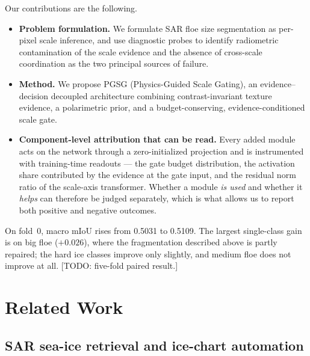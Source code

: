 \documentclass[preprint,12pt,authoryear]{elsarticle}
\begin{document}
Our contributions are the following.
\begin{itemize}
\item \textbf{Problem formulation.} We formulate SAR floe size segmentation as
      per-pixel scale inference, and use diagnostic probes to identify
      radiometric contamination of the scale evidence and the absence of
      cross-scale coordination as the two principal sources of failure.
\item \textbf{Method.} We propose PGSG (Physics-Guided Scale Gating), an
      evidence--decision decoupled architecture combining contrast-invariant
      texture evidence, a polarimetric prior, and a budget-conserving,
      evidence-conditioned scale gate.
\item \textbf{Component-level attribution that can be read.} Every added module
      acts on the network through a zero-initialized projection and is
      instrumented with training-time readouts --- the
      gate budget distribution, the activation share contributed by the evidence
      at the gate input, and the residual norm ratio of the scale-axis
      transformer. Whether a module \emph{is used} and whether it \emph{helps}
      can therefore be judged separately, which is what allows us to report both
      positive and negative outcomes.
\end{itemize}
On fold~0, macro mIoU rises from 0.5031 to 0.5109. The largest single-class gain
is on big floe ($+0.026$), where the fragmentation described above is partly
repaired; the hard ice classes improve only slightly, and medium floe does not
improve at all. [TODO: five-fold paired result.]

\section{Related Work}
\label{sec:related}

\subsection{SAR sea-ice retrieval and ice-chart automation}
\end{document}
